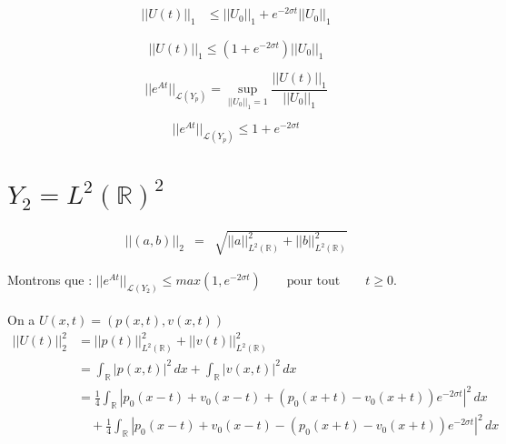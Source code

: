 \documentclass[a4paper,11pt]{article}
\begin{document}
\begin{equation*}
\begin{split}
    ||U(t)||_1 & \le ||U_0||_{1} 
    + e^{-2\sigma t} ||U_0||_{1}
\end{split}
\end{equation*}

\begin{equation}
    ||U(t)||_1 \le \left( 1 + e^{-2\sigma t} \right) ||U_0||_{1}
\end{equation}

\begin{equation*}
||e^{At}||_{\mathcal{L}(Y_p)} = \sup_{||U_{0}||_1 = 1}\frac{||U(t)||_1}{||U_{0}||_1}
\end{equation*}

\begin{equation*}
    ||e^{At}||_{\mathcal{L}(Y_p)} \le 1 + e^{-2\sigma t}
\end{equation*}


\section{\( Y_{2} = L^{2}(\mathbb{R})^{2} \)}

\begin{equation*}
\begin{array}{rcl}
    ||(a,b)||_{2} &=& \sqrt{||a||^{2}_{L^{2}(\mathbb{R})} + ||b||^{2}_{L^{2}(\mathbb{R})}}
\end{array}
\end{equation*}

Montrons que :
\( ||e^{At}||_{\mathcal{L}(Y_2)}\leq max(1, e^{-2\sigma t}) \qquad \mbox{pour tout} \qquad t\geq 0. \)\\ \\
On a \( U(x,t)=(p(x,t),v(x,t)) \) \\

\begin{equation*}
\begin{split}
    ||U(t)||^{2}_{2} &= ||p(t)||^{2}_{L^{2}(\mathbb{R})} + ||v(t)||^{2}_{L^{2}(\mathbb{R})} \\
    &= \int_{\mathbb{R}}{|p(x,t)|^{2}\,dx} + \int_{\mathbb{R}}{|v(x,t)|^{2}\,dx} \\
    &= \frac{1}{4} \int_{\mathbb{R}} |p_0(x-t)+v_0(x-t) + (p_0(x+t)-v_0(x+t)) e^{-2\sigma t} |^{2} \,dx \\
    & \quad +\frac{1}{4} \int_{\mathbb{R}} |p_0(x-t) + v_0(x-t) - (p_0(x+t) - v_0(x+t)) e^{-2\sigma t}|^{2} \,dx 
\end{split}
\end{equation*}
\end{document}
